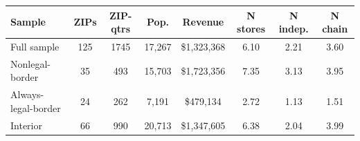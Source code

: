 \begin{tabular}{@{}lccccccc@{}}
\toprule
Sample & ZIPs & ZIP-qtrs & Pop. & Revenue & N stores & N indep. & N chain \\
\midrule
Full sample & 125 & 1745 & 17,267 & \$1,323,368 & 6.10 & 2.21 & 3.60 \\
Nonlegal-border & 35 & 493 & 15,703 & \$1,723,356 & 7.35 & 3.13 & 3.95 \\
Always-legal-border & 24 & 262 & 7,191 & \$479,134 & 2.72 & 1.13 & 1.51 \\
Interior & 66 & 990 & 20,713 & \$1,347,605 & 6.38 & 2.04 & 3.99 \\
\bottomrule
\end{tabular}

